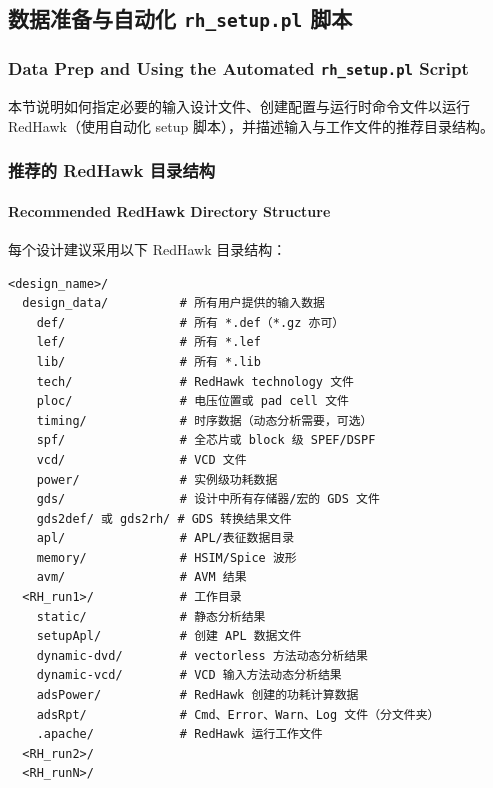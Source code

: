 \subsection{数据准备与自动化 \texttt{rh\_setup.pl} 脚本}
\subsubsection*{Data Prep and Using the Automated \texttt{rh\_setup.pl} Script}

本节说明如何指定必要的输入设计文件、创建配置与运行时命令文件以运行 RedHawk（使用自动化 setup 脚本），并描述输入与工作文件的推荐目录结构。

\subsubsection{推荐的 RedHawk 目录结构}
\paragraph*{Recommended RedHawk Directory Structure}

每个设计建议采用以下 RedHawk 目录结构：

\begin{verbatim}
<design_name>/
  design_data/          # 所有用户提供的输入数据
    def/                # 所有 *.def（*.gz 亦可）
    lef/                # 所有 *.lef
    lib/                # 所有 *.lib
    tech/               # RedHawk technology 文件
    ploc/               # 电压位置或 pad cell 文件
    timing/             # 时序数据（动态分析需要，可选）
    spf/                # 全芯片或 block 级 SPEF/DSPF
    vcd/                # VCD 文件
    power/              # 实例级功耗数据
    gds/                # 设计中所有存储器/宏的 GDS 文件
    gds2def/ 或 gds2rh/ # GDS 转换结果文件
    apl/                # APL/表征数据目录
    memory/             # HSIM/Spice 波形
    avm/                # AVM 结果
  <RH_run1>/            # 工作目录
    static/             # 静态分析结果
    setupApl/           # 创建 APL 数据文件
    dynamic-dvd/        # vectorless 方法动态分析结果
    dynamic-vcd/        # VCD 输入方法动态分析结果
    adsPower/           # RedHawk 创建的功耗计算数据
    adsRpt/             # Cmd、Error、Warn、Log 文件（分文件夹）
    .apache/            # RedHawk 运行工作文件
  <RH_run2>/
  <RH_runN>/
\end{verbatim}

